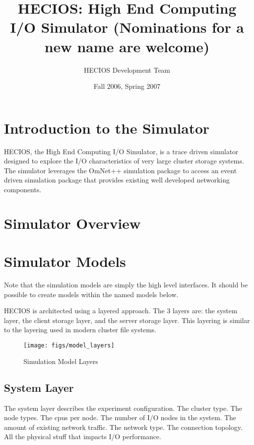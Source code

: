 \documentclass[11pt]{article}
\title{HECIOS: High End Computing I/O Simulator 
       (Nominations for a new name are welcome)}
\author{HECIOS Development Team}
\date{Fall 2006, Spring 2007}
\begin{document}
\maketitle
\newpage


%
%
\setlength{\parindent}{0pt}
\setlength{\parskip}{11pt}

%
%
\section{Introduction to the Simulator}
HECIOS, the High End Computing I/O Simulator, is a trace driven simulator
designed to explore the I/O characteristics of very large cluster storage
systems.  The simulator leverages the OmNet++ simulation package to access an
event driven simulation package that provides existing well developed
networking components.

\section{Simulator Overview}

\section{Simulator Models}
Note that the simulation models are simply the high level interfaces.  It
should be possible to create models within the named models below.

HECIOS is architected using a layered approach.  The 3 layers are: the system
layer, the client storage layer, and the server storage layer.  This layering
is similar to the layering used in modern cluster file systems.
 
\begin{figure}[t]
  \begin{center}
    \texttt{[image: figs/model\_layers]}
  \end{center}
  \caption{Simulation Model Layers \label{fig:model-layers}}
\end{figure}

\subsection{System Layer}
The system layer describes the experiment configuration.  The cluster type.
The node types.  The cpus per node.  The number of I/O nodes in the system.
The amount of existing network traffic.  The network type.  The connection
topology.  All the physical stuff that impacts I/O performance.
\end{document}
